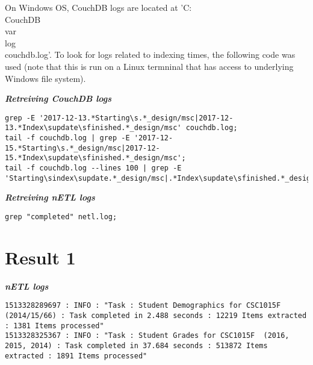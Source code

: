 On Windows OS, CouchDB logs are located at 'C:\\CouchDB\\var\\log\\couchdb.log'. To look for logs related to indexing times, the following code was used (note that this is run on a Linux termninal that has access to underlying Windows file system).

\textit{\textbf{Retreiving CouchDB logs}}
\begin{verbatim}
grep -E '2017-12-13.*Starting\s.*_design/msc|2017-12-13.*Index\supdate\sfinished.*_design/msc' couchdb.log;
tail -f couchdb.log | grep -E '2017-12-15.*Starting\s.*_design/msc|2017-12-15.*Index\supdate\sfinished.*_design/msc';
tail -f couchdb.log --lines 100 | grep -E 'Starting\sindex\supdate.*_design/msc|.*Index\supdate\sfinished.*_design/msc'
\end{verbatim}

\textit{\textbf{Retreiving nETL logs}}
\begin{verbatim}
grep "completed" netl.log;
\end{verbatim}


\section{Result 1}
\textit{\textbf{nETL logs}}
\begin{verbatim}
1513328289697 : INFO : "Task : Student Demographics for CSC1015F (2014/15/66) : Task completed in 2.488 seconds : 12219 Items extracted : 1381 Items processed"
1513328325367 : INFO : "Task : Student Grades for CSC1015F  (2016, 2015, 2014) : Task completed in 37.684 seconds : 513872 Items extracted : 1891 Items processed"
\end{verbatim}

